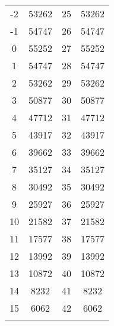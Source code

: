 \begin{table}[H]
\begin{tabular}{cc@{\hspace{12mm}}cc}
         -2 & 53262 &    25 & 53262  \\
         -1 & 54747 &    26 & 54747  \\
          0 & 55252 &    27 & 55252  \\
          1 & 54747 &    28 & 54747  \\
          2 & 53262 &    29 & 53262  \\
          3 & 50877 &    30 & 50877  \\
          4 & 47712 &    31 & 47712  \\
          5 & 43917 &    32 & 43917  \\
          6 & 39662 &    33 & 39662  \\
          7 & 35127 &    34 & 35127  \\
          8 & 30492 &    35 & 30492  \\
          9 & 25927 &    36 & 25927  \\
         10 & 21582 &    37 & 21582  \\
         11 & 17577 &    38 & 17577  \\
         12 & 13992 &    39 & 13992  \\
         13 & 10872 &    40 & 10872  \\
         14 &  8232 &    41 &  8232  \\
         15 &  6062 &    42 &  6062  \\
        \myhline
    \end{tabular}
\end{table}
